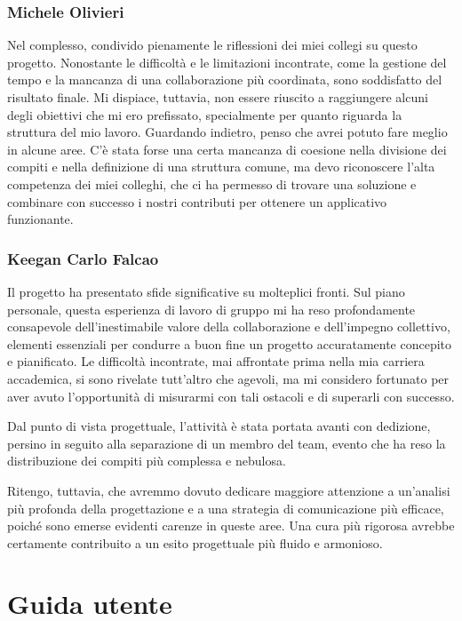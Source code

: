 \documentclass[a4paper,12pt]{report}
\begin{document}
\subsection{Michele Olivieri}
Nel complesso, condivido pienamente le riflessioni dei miei collegi su questo progetto. Nonostante le difficoltà e le limitazioni incontrate, come la gestione del tempo e la mancanza di una collaborazione più coordinata, sono soddisfatto del risultato finale. Mi dispiace, tuttavia, non essere riuscito a raggiungere alcuni degli obiettivi che mi ero prefissato, specialmente per quanto riguarda la struttura del mio lavoro. Guardando indietro, penso che avrei potuto fare meglio in alcune aree. C'è stata forse una certa mancanza di coesione nella divisione dei compiti e nella definizione di una struttura comune, ma devo riconoscere l'alta competenza dei miei colleghi, che ci ha permesso di trovare una soluzione e combinare con successo i nostri contributi per ottenere un applicativo funzionante.
\subsection{Keegan Carlo Falcao}
Il progetto ha presentato sfide significative su molteplici fronti. Sul piano personale, questa esperienza di lavoro di gruppo mi ha reso profondamente consapevole dell'inestimabile valore della collaborazione e dell'impegno collettivo, elementi essenziali per condurre a buon fine un progetto accuratamente concepito e pianificato. Le difficoltà incontrate, mai affrontate prima nella mia carriera accademica, si sono rivelate tutt'altro che agevoli, ma mi considero fortunato per aver avuto l'opportunità di misurarmi con tali ostacoli e di superarli con successo.

Dal punto di vista progettuale, l'attività è stata portata avanti con dedizione, persino in seguito alla separazione di un membro del team, evento che ha reso la distribuzione dei compiti più complessa e nebulosa.

Ritengo, tuttavia, che avremmo dovuto dedicare maggiore attenzione a un'analisi più profonda della progettazione e a una strategia di comunicazione più efficace, poiché sono emerse evidenti carenze in queste aree. Una cura più rigorosa avrebbe certamente contribuito a un esito progettuale più fluido e armonioso.
	
	\appendix
	\chapter{Guida utente}
	
\end{document}
